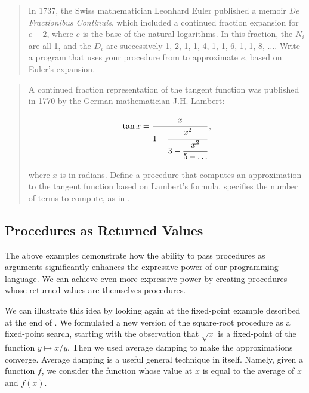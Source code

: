 \begin{quote}
 In 1737, the Swiss mathematician
Leonhard Euler published a memoir \textit{De Fractionibus Continuis}, which
included a continued fraction expansion for \( e - 2 \), where \( e \) is the base
of the natural logarithms.  In this fraction, the \( N_i \) are all 1, and
the \( D_i \) are successively 1, 2, 1, 1, 4, 1, 1, 6, 1, 1, 8, \( \dots \).
Write a program that uses your  procedure from 
to approximate \( e \), based on Euler's expansion.
\end{quote}

\begin{quote}
 A continued fraction
representation of the tangent function was published in 1770 by the German
mathematician J.H. Lambert:
\begin{comment}

\begin{example}
              x
tan x = ---------------
                x^2
        1 - -----------
                  x^2
            3 - -------
                5 - ...
\end{example}

\end{comment}

$$ {\tan x} = \cfrac{x}{1 - \cfrac{x^2}{3 - \cfrac{x^2}{5 - \dots}}}\,, $$

\noindent
where \( x \) is in radians.  Define a procedure  that
computes an approximation to the tangent function based on Lambert's formula.
 specifies the number of terms to compute, as in .
\end{quote}

\subsection{Procedures as Returned Values}
\label{Section 1.3.4}

The above examples demonstrate how the ability to pass procedures as arguments
significantly enhances the expressive power of our programming language.  We
can achieve even more expressive power by creating procedures whose returned
values are themselves procedures.

We can illustrate this idea by looking again at the fixed-point example
described at the end of .  We formulated a new version of
the square-root procedure as a fixed-point search, starting with the
observation that \( \sqrt{x} \) is a fixed-point of the function \( y \mapsto
x / y \).  Then we used average damping to make the approximations converge.
Average damping is a useful general technique in itself.  Namely, given a
function \( f \), we consider the function whose value at \( x \) is equal to the
average of \( x \) and \( f(x) \).

